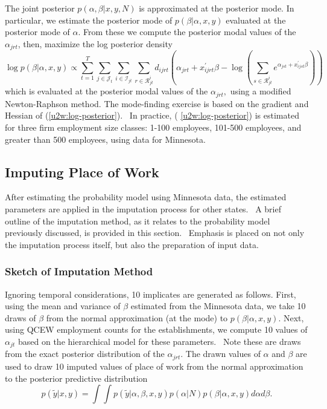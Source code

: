 The joint
posterior $p\left( \alpha ,\beta |x,y,N\right) $ is approximated at the
posterior mode. In particular, we estimate the posterior mode of $p\left(
\beta |\alpha ,x,y\right) $ evaluated at the posterior mode of $\alpha $.
From these we compute the posterior modal values of the $\alpha _{jrt}$,
then, maximize the log posterior density 
\begin{equation}
\log p\left( \beta |\alpha ,x,y\right) \varpropto \sum_{t=1}^{T}\sum_{j\in 
\mathcal{J}_{t}}\sum_{i\in \mathcal{I}_{jt}}\sum_{r\in \mathcal{R}%
_{jt}^{i}}d_{ijrt}\left( \alpha _{jrt}+x_{ijrt}^{\prime }\beta -\log \left(
\sum_{s\in \mathcal{R}_{jt}^{i}}e^{\alpha _{jst}+x_{ijst}^{\prime }\beta
}\right) \right)   \label{u2w:log-posterior}
\end{equation}%
which is evaluated at the posterior modal values of the $\alpha _{jrt},$
using a modified Newton-Raphson method. The mode-finding exercise is based
on the gradient and Hessian of (\ref{u2w:log-posterior}). \ In practice, (%
\ref{u2w:log-posterior}) is estimated for three firm employment size
classes: 1-100 employees, 101-500 employees, and greater than 500 employees,
using data for Minnesota.

\subsection{Imputing Place of Work}

After estimating the probability model using Minnesota data, the estimated
parameters are applied in the imputation process for other states. \ A brief
outline of the imputation method, as it relates to the probability model
previously discussed, is provided in this section. \ Emphasis is placed on
not only the imputation process itself, but also the preparation of input
data.

\subsubsection{Sketch of Imputation Method}

Ignoring temporal considerations, 10 implicates are generated as follows.
First, using the mean and variance of $\beta $ estimated from the Minnesota
data, we take 10 draws of $\beta $ from the normal approximation (at the
mode) to $p\left( \beta |\alpha ,x,y\right)$. Next, using QCEW employment
counts for the establishments, we compute 10 values of $\alpha _{jt}$ based
on the hierarchical model for these parameters. \ Note these are draws from
the exact posterior distribution of the $\alpha _{jrt}$. The drawn values of 
$\alpha $ and $\beta $ are used to draw 10 imputed values of place of work
from the normal approximation to the posterior predictive distribution%
\begin{equation}
p\left( \tilde{y}|x,y\right) =\int \int p\left( \tilde{y}|\alpha ,\beta
,x,y\right) p\left( \alpha |N\right) p\left( \beta |\alpha ,x,y\right)
d\alpha d\beta .  \label{u2w:post-pred}
\end{equation}

